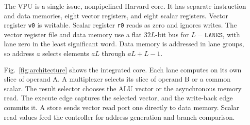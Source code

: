 \documentclass[conference]{IEEEtran}
\begin{document}
The VPU is a single-issue, nonpipelined Harvard core. It has separate
instruction and data memories, eight vector registers, and eight scalar
registers. Vector register \texttt{v0} is writable. Scalar register
\texttt{r0} reads as zero and ignores writes. The vector register file and
data memory use a flat \(32L\)-bit bus for \(L=\texttt{LANES}\), with lane
zero in the least significant word. Data memory is addressed in lane groups,
so address \(a\) selects elements \(aL\) through \(aL+L-1\).

Fig.~\ref{fig:architecture} shows the integrated core. Each lane computes on
its own slice of operand A. A multiplexer selects its slice of operand B or
a common scalar. The result selector chooses the ALU vector or the
asynchronous memory read. The execute edge captures the selected vector,
and the write-back edge commits it. A store sends vector read port one
directly to data memory. Scalar read values feed the controller for address
generation and branch comparison.
\end{document}
